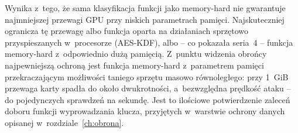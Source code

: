 Wynika z~tego, że sama klasyfikacja funkcji jako memory-hard nie gwarantuje najmniejszej przewagi GPU przy niskich parametrach pamięci. Najskuteczniej ogranicza tę przewagę albo funkcja oparta na działaniach sprzętowo przyspieszanych w~procesorze (AES-KDF), albo -- co pokazała seria~4 -- funkcja memory-hard z~odpowiednio dużą pamięcią. Z~punktu widzenia obrońcy najpewniejszą ochroną jest funkcja memory-hard z~parametrem pamięci przekraczającym możliwości taniego sprzętu masowo równoległego: przy 1~GiB przewaga karty spadła do około dwukrotności, a~bezwzględna prędkość ataku -- do pojedynczych sprawdzeń na sekundę. Jest to ilościowe potwierdzenie zaleceń doboru funkcji wyprowadzania klucza, przyjętych w~warstwie ochrony danych opisanej w~rozdziale~\ref{ch:obrona}.
